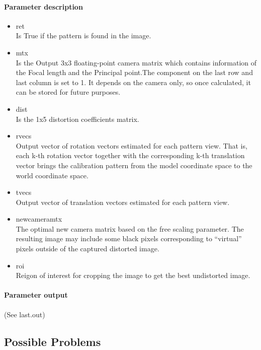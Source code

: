 \documentclass{scrartcl}
\begin{document}
\paragraph{Parameter description}
\begin{itemize}
\item ret\\
Is True if the pattern is found in the image.

\item mtx\\
Is the Output 3x3 floating-point camera matrix which contains information of the Focal length and the Principal point.The component on the last row and last column is set to 1.
It depends on the camera only, so once calculated, it can be stored for future purposes.
\item dist\\
Is the 1x5 distortion coefficients matrix.
\item rvecs\\
Output vector of rotation vectors estimated for each pattern view. That is, each k-th rotation vector together with the corresponding k-th translation vector brings the calibration pattern from the model coordinate space to the world coordinate space.
\item tvecs\\
Output vector of translation vectors estimated for each pattern view.
\item newcameramtx\\
The optimal new camera matrix based on the free scaling parameter. The resulting image may include some black pixels corresponding to “virtual” pixels outside of the captured distorted image.
\item roi\\
Reigon of interest for cropping the image to get the best undistorted image.
\end{itemize}

\paragraph{Parameter output}
(See last.out)


\subsection{Possible Problems}
\end{document}
